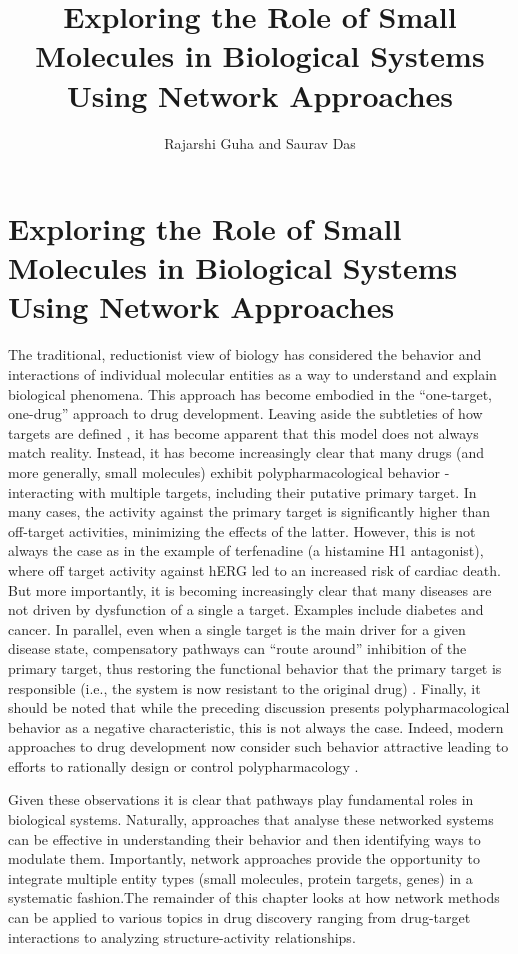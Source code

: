 \documentclass[]{book}
\title{Exploring the Role of Small Molecules in Biological Systems Using Network Approaches}
\author{Rajarshi Guha and Saurav Das}
\begin{document}
\frontmatter
\mainmatter

\chapter{Exploring the Role of Small Molecules in Biological Systems
  Using Network Approaches}

The traditional, reductionist view of biology has considered the
behavior and interactions of individual molecular entities as a way to
understand and explain biological phenomena. This approach has become
embodied in the ``one-target, one-drug'' approach to drug
development. Leaving aside the subtleties of how targets are defined
\cite{Imming:2006lt}, it has become apparent that this model does not
always match reality. Instead, it has become increasingly clear that
many drugs (and more generally, small molecules) exhibit
polypharmacological behavior - interacting with multiple targets,
including their putative primary target. In many cases, the activity
against the primary target is significantly higher than off-target
activities, minimizing the effects of the latter. However, this is not
always the case as in the example of terfenadine (a histamine H1
antagonist), where off target activity against hERG
\cite{Crumb:1995it} led to an increased risk of cardiac death. But
more importantly, it is becoming increasingly clear that many diseases
are not driven by dysfunction of a single a target. Examples include
diabetes and cancer. In parallel, even when a single target is the
main driver for a given disease state, compensatory pathways can
``route around'' inhibition of the primary target, thus restoring the
functional behavior that the primary target is responsible (i.e., the
system is now resistant to the original drug)
\cite{Sierra:2010mz,Dienstmann:2012qr}. Finally, it should be noted
that while the preceding discussion presents polypharmacological
behavior as a negative characteristic, this is not always the
case. Indeed, modern approaches to drug development now consider such
behavior attractive leading to efforts to rationally design or control
polypharmacology \cite{Gujral:2014dp,Ciceri:2014fv,Metz:2010ys}.

Given these observations it is clear that pathways play fundamental
roles in biological systems. Naturally, approaches that analyse these
networked systems can be effective in understanding their behavior and
then identifying ways to modulate them. Importantly, network
approaches provide the opportunity to integrate multiple entity types
(small molecules, protein targets, genes) in a systematic fashion.The
remainder of this chapter looks at how network methods can be applied
to various topics in drug discovery ranging from drug-target
interactions to analyzing structure-activity relationships.
\end{document}
